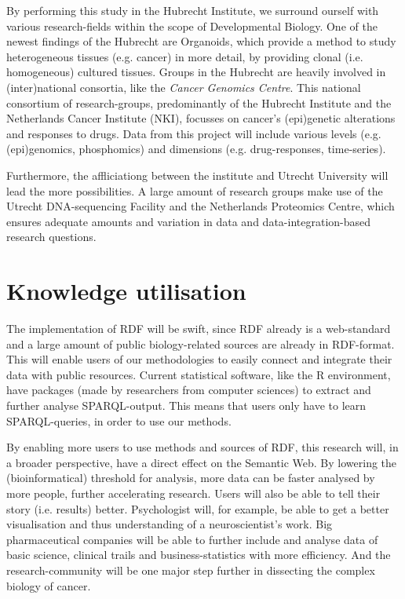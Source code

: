 \documentclass[twoside,fontsize=10pt]{article}
\begin{document}
By performing this study in the Hubrecht Institute, we surround ourself with various research-fields within the scope of Developmental Biology. One of the newest findings of the Hubrecht are Organoids, which provide a method to study heterogeneous tissues (e.g. cancer) in more detail, by providing clonal (i.e. homogeneous) cultured tissues. Groups in the Hubrecht are heavily involved in (inter)national consortia, like the \textit{Cancer Genomics Centre}. This national consortium of research-groups, predominantly of the Hubrecht Institute and the Netherlands Cancer Institute (NKI), focusses on cancer's (epi)genetic alterations and responses to drugs. Data from this project will include various levels (e.g. (epi)genomics, phosphomics) and dimensions (e.g. drug-responses, time-series). 

Furthermore, the affliciationg between the institute and Utrecht University will lead the more possibilities. A large amount of research groups make use of the Utrecht DNA-sequencing Facility and the Netherlands Proteomics Centre, which ensures adequate amounts and variation in data and data-integration-based research questions. 
\section*{Knowledge utilisation}
The implementation of RDF will be swift, since RDF already is a web-standard and a large amount of public biology-related sources are already in RDF-format. This will enable users of our methodologies to easily connect and integrate their data with public resources. Current statistical software, like the R environment, have packages (made by researchers from computer sciences) to extract and further analyse SPARQL-output. This means that users only have to learn SPARQL-queries, in order to use our methods.

By enabling more users to use methods and sources of RDF, this research will, in a broader perspective, have a direct effect on the Semantic Web. By lowering the (bioinformatical) threshold for analysis, more data can be faster analysed by more people, further accelerating research. Users will also be able to tell their story (i.e. results) better. Psychologist will, for example, be able to get a better visualisation and thus understanding of a neuroscientist's work. Big pharmaceutical companies will be able to further include and analyse data of basic science, clinical trails and business-statistics with more efficiency. And the research-community will be one major step further in dissecting the complex biology of cancer.
\end{document}
